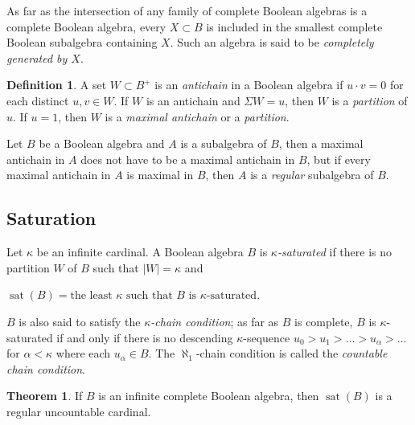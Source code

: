 \documentclass[8pt]{article}
\theoremstyle{definition}
\newtheorem{definition}{Definition}[section]
\theoremstyle{definition}
\newtheorem{theorem}{Theorem}[section]
\theoremstyle{definition}
\theoremstyle{definition}
\theoremstyle{definition}
\theoremstyle{definition}
\theoremstyle{definition}
\theoremstyle{definition}
\theoremstyle{definition}
\theoremstyle{definition}
\theoremstyle{definition}
\theoremstyle{definition}
\theoremstyle{definition}
\theoremstyle{definition}
\theoremstyle{question}
\begin{document}
As far as the intersection of any family of complete Boolean algebras is a complete Boolean algebra,
every $X \subset B$ is included in the smallest complete Boolean subalgebra containing $X$. 
Such an algebra is said to be \emph{completely generated by $X$}.

\begin{definition}
  A set $W \subset B^+$ is an \emph{antichain} in a Boolean algebra if $u \cdot v = 0$ for each distinct $u, v \in W$.
  If $W$ is an antichain and $\Sigma W = u$, then $W$ is a \emph{partition} of $u$. If $u = 1$, 
  then $W$ is a \emph{maximal antichain} or a \emph{partition}.
\end{definition}

Let $B$ be a Boolean algebra and $A$ is a subalgebra of $B$, then a maximal antichain in $A$ does not have
to be a maximal antichain in $B$, but if every maximal antichain in $A$ is maximal in $B$, then $A$ is a \emph{regular}
subalgebra of $B$.

\subsection{Saturation}

Let $\kappa$ be an infinite cardinal. A Boolean algebra $B$ is \emph{$\kappa$-saturated} if 
there is no partition $W$ of $B$ such that $|W| = \kappa$ and
\begin{center}
  $\operatorname{sat}(B) = \text{the least $\kappa$ such that $B$ is $\kappa$-saturated}$.
\end{center}
$B$ is also said to satisfy the \emph{$\kappa$-chain condition}; as far as $B$ is complete, 
$B$ is $\kappa$-saturated if and only if there is no descending $\kappa$-sequence 
$u_0 > u_1 > \dots > u_{\alpha} > \dots$ for $\alpha < \kappa$ where each $u_{\alpha} \in B$.
The $\aleph_1$-chain condition is called the \emph{countable chain condition}.

\begin{theorem}
  If $B$ is an infinite complete Boolean algebra, then $\operatorname{sat}(B)$ is a regular uncountable cardinal.
\end{theorem}
\end{document}

